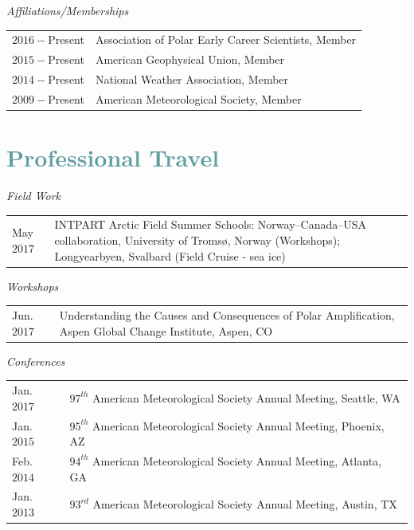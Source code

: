 \documentclass[margin,line,palatino,courier,10pt]{res}
\begin{document}
\begin{resume}
\textit{Affiliations/Memberships}
\vspace*{0.05in}\\
\begin{tabular}{@{}p{0.8in}p{4in}}
$2016 - $Present & Association of Polar Early Career Scientists, Member\\ 
$2015 - $Present & American Geophysical Union, Member\\
$2014 -$Present & National Weather Association, Member\\
$2009 -$Present & American Meteorological Society, Member\\
\end{tabular}

\section{\sc \textcolor{CadetBlue}{\large{Professional Travel}}}
\textit{Field Work}
\vspace*{0.05in}\\
\begin{tabular}{@{}p{0.8in}p{4in}}
May $2017$ & INTPART Arctic Field Summer Schools: Norway--Canada--USA collaboration, University of Troms\o, Norway (Workshops); Longyearbyen, Svalbard (Field Cruise - sea ice)
\end{tabular}

\textit{Workshops}
\vspace*{0.05in}\\
\begin{tabular}{@{}p{0.8in}p{4in}}
Jun. $2017$ & Understanding the Causes and Consequences of Polar Amplification, Aspen Global Change Institute, Aspen, CO
\end{tabular}

\textit{Conferences}
\vspace*{0.05in}\\
\begin{tabular}{@{}p{0.8in}p{4in}}
Jan. $2017$ & $97^ {th} $ American Meteorological Society Annual Meeting, Seattle, WA \\
Jan. $2015$ & $95^ {th} $ American Meteorological Society Annual Meeting, Phoenix, AZ \\
Feb. $2014$ & $94^ {th} $ American Meteorological Society Annual Meeting, Atlanta, GA \\
Jan. $2013$ & $93^ {rd} $ American Meteorological Society Annual Meeting, Austin, TX \\
\end{tabular}


\end{resume}
\end{document}
